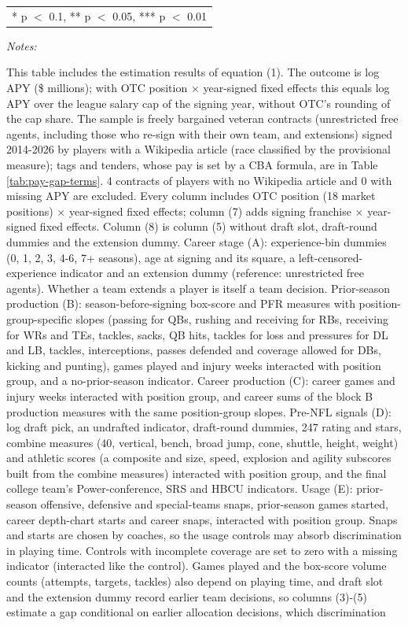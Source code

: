 \begin{table}[!h]
{\begin{threeparttable}
\begin{tabular}[t]{lcccccccc}
\bottomrule
\multicolumn{9}{l}{\rule{0pt}{1em}* p $<$ 0.1, ** p $<$ 0.05, *** p $<$ 0.01}\\
\end{tabular}
\begin{tablenotes}[para]
\item \textit{Notes:} 
\item This table includes the estimation results of equation (1). The outcome is log APY (\$ millions); with OTC position $\times$ year-signed fixed effects this equals log APY over the league salary cap of the signing year, without OTC's rounding of the cap share. The sample is freely bargained veteran contracts (unrestricted free agents, including those who re-sign with their own team, and extensions) signed 2014-2026 by players with a Wikipedia article (race classified by the provisional measure); tags and tenders, whose pay is set by a CBA formula, are in Table \ref{tab:pay-gap-terms}. 4 contracts of players with no Wikipedia article and 0 with missing APY are excluded. Every column includes OTC position (18 market positions) $\times$ year-signed fixed effects; column (7) adds signing franchise $\times$ year-signed fixed effects. Column (8) is column (5) without draft slot, draft-round dummies and the extension dummy. Career stage (A): experience-bin dummies (0, 1, 2, 3, 4-6, 7+ seasons), age at signing and its square, a left-censored-experience indicator and an extension dummy (reference: unrestricted free agents). Whether a team extends a player is itself a team decision. Prior-season production (B): season-before-signing box-score and PFR measures with position-group-specific slopes (passing for QBs, rushing and receiving for RBs, receiving for WRs and TEs, tackles, sacks, QB hits, tackles for loss and pressures for DL and LB, tackles, interceptions, passes defended and coverage allowed for DBs, kicking and punting), games played and injury weeks interacted with position group, and a no-prior-season indicator. Career production (C): career games and injury weeks interacted with position group, and career sums of the block B production measures with the same position-group slopes. Pre-NFL signals (D): log draft pick, an undrafted indicator, draft-round dummies, 247 rating and stars, combine measures (40, vertical, bench, broad jump, cone, shuttle, height, weight) and athletic scores (a composite and size, speed, explosion and agility subscores built from the combine measures) interacted with position group, and the final college team's Power-conference, SRS and HBCU indicators. Usage (E): prior-season offensive, defensive and special-teams snaps, prior-season games started, career depth-chart starts and career snaps, interacted with position group. Snaps and starts are chosen by coaches, so the usage controls may absorb discrimination in playing time. Controls with incomplete coverage are set to zero with a missing indicator (interacted like the control). Games played and the box-score volume counts (attempts, targets, tackles) also depend on playing time, and draft slot and the extension dummy record earlier team decisions, so columns (3)-(5) estimate a gap conditional on earlier allocation decisions, which discrimination 
\end{tablenotes}
\end{threeparttable}}
\end{table}

